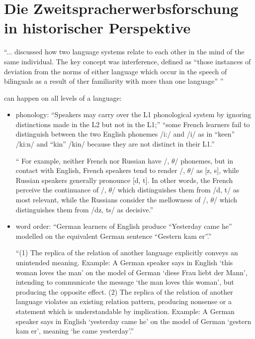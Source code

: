 \section{Die Zweitspracherwerbsforschung in historischer Perspektive}
\cite{Weinreich79} ``... discussed how two language systems relate to each other in the mind of the same individual.
The key concept was interference, defined as ``those instances of deviation from the norms of either language which occur in the speech of bilinguals as a result of ther familiarity with more than one language'' \cite{Weinreich79} '' \cite{Cook93}

can happen on all levels of a language:
\begin{itemize}
    \item phonology: ``Speakers may carry over the L1 phonological system by ignoring distinctions made in the L2 but not in the L1;'' \cite{Cook93}
        ``some French learners fail to distinguish between the two English phonemes /i:/ and /i/ as in ``keen'' /ki:n/ and ``kin'' /kin/ because they are not distinct in their L1.''

        \cite{Weinreich79} `` For example, neither French nor Russian have /, $\theta$/ phonemes, but in contact
        with English, French speakers tend to render /, $\theta$/ as [z, s], while Russian
        speakers generally pronounce [d, t].
        In other words, the French perceive the continuance of /, $\theta$/ which distinguishes them from /d, t/ as most relevant, while
        the Russians consider the mellowness of /, $\theta$/ which distinguishes them from /dz, ts/ as decisive.''


    \item word order: ``German learners of English produce ``Yesterday came he'' modelled on the equivalent German sentence ``Gestern kam er''.''

        \cite{Weinreich79} ``(1) The replica of the relation of another language explicitly conveys an unintended meaning.
        Example: A German speaker says in English `this woman loves the man' on the model of German
        `diese Frau liebt der Mann', intending to communicate the message `the man
        loves this woman', but producing the opposite effect.
        (2) The replica of the relation of another language violates an existing relation pattern, producing
        nonsense or a statement which is understandable by implication.
        Example: A German speaker says in English `yesterday came he' on the model of German
        `gestern kam er', meaning `he came yesterday'.''


\end{itemize}

